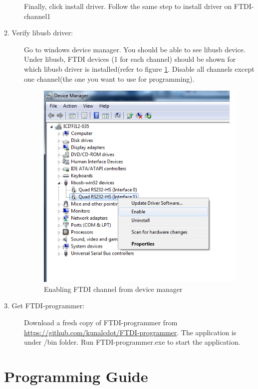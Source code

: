 \documentclass[a4paper,12pt]{report}%
\begin{document}
\begin{description}
		Finally, click install driver.
		Follow the same step to install driver on FTDI-channel1
		
		\item [2. Verify libusb driver:]
		Go to windows device manager. You should be able to see libusb device. Under libusb, FTDI devices
		(1 for each channel) should be shown 
		for which libusb driver is installed(refer to figure \ref{fig:device_manager}. Disable all 
		channels except one channel(the one you want to use for programming). 
		
			\begin{figure}[h]
				
				\centering
				\includegraphics[scale = 0.7]{ft_channel_enable}
				\caption{Enabling FTDI channel from device manager}
				\label{fig:device_manager}
			\end{figure}
			
		
		
		\item [3. Get FTDI-programmer:]
		Download a fresh copy of FTDI-programmer from \url{https://github.com/kunalcdot/FTDI-programmer}. The application is 
		under /bin folder. Run FTDI-programmer.exe to start the application.
		
	\end{description}
	



\section{Programming Guide}\label{sec:prog_guide}
\end{document}
